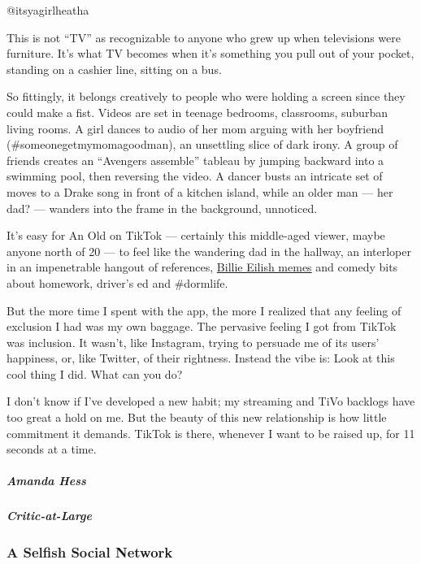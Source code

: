 \href{https://www.tiktok.com/@kaylacoste/video/6739219005397044485?u_code=d77ehf2j7m0d81\&preview_pb=0\&language=en\&timestamp=1570111059\&utm_campaign=client_share\&app=musically\&utm_medium=ios\&user_id=6713156519594181637\&tt_from=copy\&utm_source=copy\&enter_from=h5_m}{}

@itsyagirlheatha

This is not ``TV'' as recognizable to anyone who grew up when
televisions were furniture. It's what TV becomes when it's something you
pull out of your pocket, standing on a cashier line, sitting on a bus.

So fittingly, it belongs creatively to people who were holding a screen
since they could make a fist. Videos are set in teenage bedrooms,
classrooms, suburban living rooms. A girl dances to audio of her mom
arguing with her boyfriend (\#someonegetmymomagoodman), an unsettling
slice of dark irony. A group of friends creates an ``Avengers assemble''
tableau by jumping backward into a swimming pool, then reversing the
video. A dancer busts an intricate set of moves to a Drake song in front
of a kitchen island, while an older man --- her dad? --- wanders into
the frame in the background, unnoticed.

It's easy for An Old on TikTok --- certainly this middle-aged viewer,
maybe anyone north of 20 --- to feel like the wandering dad in the
hallway, an interloper in an impenetrable hangout of references,
\href{https://www.youtube.com/watch?v=nuYM4jKOick}{Billie Eilish memes}
and comedy bits about homework, driver's ed and \#dormlife.

But the more time I spent with the app, the more I realized that any
feeling of exclusion I had was my own baggage. The pervasive feeling I
got from TikTok was inclusion. It wasn't, like Instagram, trying to
persuade me of its users' happiness, or, like Twitter, of their
rightness. Instead the vibe is: Look at this cool thing I did. What can
you do?

I don't know if I've developed a new habit; my streaming and TiVo
backlogs have too great a hold on me. But the beauty of this new
relationship is how little commitment it demands. TikTok is there,
whenever I want to be raised up, for 11 seconds at a time.

\hypertarget{amanda-hess-1}{%
\subparagraph{Amanda Hess}\label{amanda-hess-1}}

\hypertarget{critic-at-large}{%
\subparagraph{Critic-at-Large}\label{critic-at-large}}

\hypertarget{a-selfish-social-network}{%
\subsubsection{A Selfish Social
Network}\label{a-selfish-social-network}}

